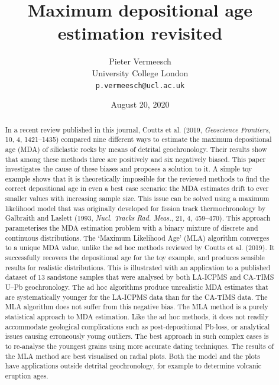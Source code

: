 \documentclass{article}
\title{Maximum depositional age estimation revisited}
\author{Pieter Vermeesch\\
  University College London\\
  \texttt{p.vermeesch@ucl.ac.uk}
}
\date{August 20, 2020}
\begin{document}


\maketitle

\begin{abstract}
  In a recent review published in this journal, Coutts et al.  (2019,
  \textit{Geoscience Frontiers}, 10, 4, 1421--1435) compared nine
  different ways to estimate the maximum depositional age (MDA) of
  siliclastic rocks by means of detrital geochronology.  Their results
  show that among these methods three are positively and six
  negatively biased. This paper investigates the cause of these biases
  and proposes a solution to it.  A simple toy example shows that it
  is theoretically impossible for the reviewed methods to find the
  correct depositional age in even a best case scenario: the MDA
  estimates drift to ever smaller values with increasing sample
  size. This issue can be solved using a maximum likelihood model that
  was originally developed for fission track thermochronology by
  Galbraith and Laslett (1993, \textit{Nucl. Tracks Rad. Meas.}, 21,
  4, 459--470).  This approach parameterises the MDA estimation
  problem with a binary mixture of discrete and continuous
  distributions. The `Maximum Likelihood Age' (MLA) algorithm
  converges to a unique MDA value, unlike the ad hoc methods reviewed
  by Coutts et al. (2019). It successfully recovers the depositional
  age for the toy example, and produces sensible results for realistic
  distributions. This is illustrated with an application to a
  published dataset of 13 sandstone samples that were analysed by both
  LA-ICPMS and CA-TIMS U--Pb geochronology. The ad hoc algorithms
  produce unrealistic MDA estimates that are systematically younger
  for the LA-ICPMS data than for the CA-TIMS data. The MLA algorithm
  does not suffer from this negative bias. The MLA method is a purely
  statistical approach to MDA estimation. Like the ad hoc methods, it
  does not readily accommodate geological complications such as
  post-depositional Pb-loss, or analytical issues causing erroneously
  young outliers. The best approach in such complex cases is to
  re-analyse the youngest grains using more accurate dating
  techniques.  The results of the MLA method are best visualised on
  radial plots. Both the model and the plots have applications outside
  detrital geochronology, for example to determine volcanic eruption
  ages.
\end{abstract}
\end{document}

